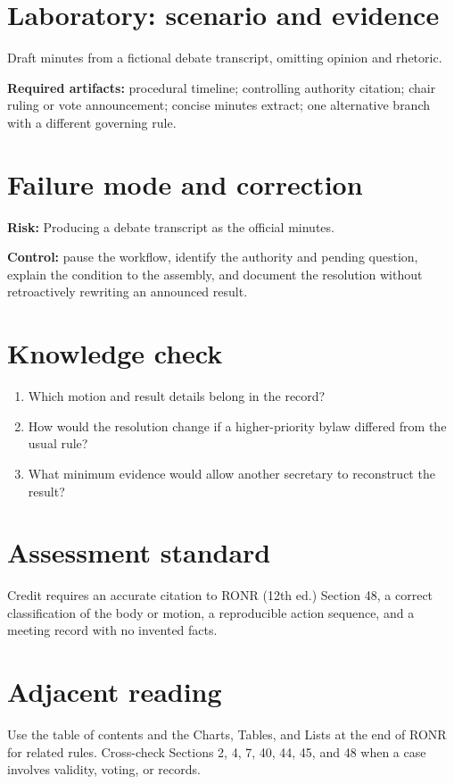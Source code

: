 \documentclass[11pt]{article}
\begin{document}
\section{Laboratory: scenario and evidence}
Draft minutes from a fictional debate transcript, omitting opinion and rhetoric.

\textbf{Required artifacts:} procedural timeline; controlling authority citation; chair ruling or vote announcement; concise minutes extract; one alternative branch with a different governing rule.

\section{Failure mode and correction}
\textbf{Risk:} Producing a debate transcript as the official minutes.

\textbf{Control:} pause the workflow, identify the authority and pending question, explain the condition to the assembly, and document the resolution without retroactively rewriting an announced result.

\section{Knowledge check}
\begin{enumerate}[leftmargin=*,itemsep=4pt]
\item Which motion and result details belong in the record?
\item How would the resolution change if a higher-priority bylaw differed from the usual rule?
\item What minimum evidence would allow another secretary to reconstruct the result?
\end{enumerate}

\section{Assessment standard}
Credit requires an accurate citation to RONR (12th ed.) Section 48, a correct classification of the body or motion, a reproducible action sequence, and a meeting record with no invented facts.

\section{Adjacent reading}
Use the table of contents and the Charts, Tables, and Lists at the end of RONR for related rules. Cross-check Sections 2, 4, 7, 40, 44, 45, and 48 when a case involves validity, voting, or records.
\end{document}
